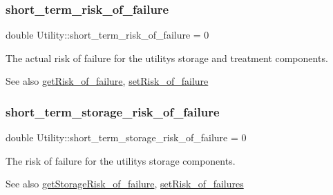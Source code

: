 \subsubsection{\texorpdfstring{short\+\_\+term\+\_\+risk\+\_\+of\+\_\+failure}{short\_term\_risk\_of\_failure}}
{\footnotesize\ttfamily double Utility\+::short\+\_\+term\+\_\+risk\+\_\+of\+\_\+failure = 0\hspace{0.3cm}{\ttfamily [private]}}



The actual risk of failure for the utility\textquotesingle{}s storage and treatment components. 

\begin{DoxySeeAlso}{See also}
\mbox{\hyperlink{classUtility_ab43bfbf7db1b5dc2e554a584b19f9e3c}{get\+Risk\+\_\+of\+\_\+failure}}, \mbox{\hyperlink{classUtility_a68d5088951f6bdccbb7af18ea8f153f5}{set\+Risk\+\_\+of\+\_\+failure}} 
\end{DoxySeeAlso}
\mbox{\label{classUtility_a9ba85088c397dac2e636b6c42490cf2e}} 
\subsubsection{\texorpdfstring{short\+\_\+term\+\_\+storage\+\_\+risk\+\_\+of\+\_\+failure}{short\_term\_storage\_risk\_of\_failure}}
{\footnotesize\ttfamily double Utility\+::short\+\_\+term\+\_\+storage\+\_\+risk\+\_\+of\+\_\+failure = 0\hspace{0.3cm}{\ttfamily [private]}}



The risk of failure for the utility\textquotesingle{}s storage components. 

\begin{DoxySeeAlso}{See also}
\mbox{\hyperlink{classUtility_aaaa05e97f2d33cf7a28b5c91ec253026}{get\+Storage\+Risk\+\_\+of\+\_\+failure}}, \mbox{\hyperlink{classUtility_aadf42161486c8305b0b55aa65c5f519e}{set\+Risk\+\_\+of\+\_\+failures}} 
\end{DoxySeeAlso}
\mbox{\label{classUtility_abf33b819a112cb4b7a29082b5c68ef2b}} 
